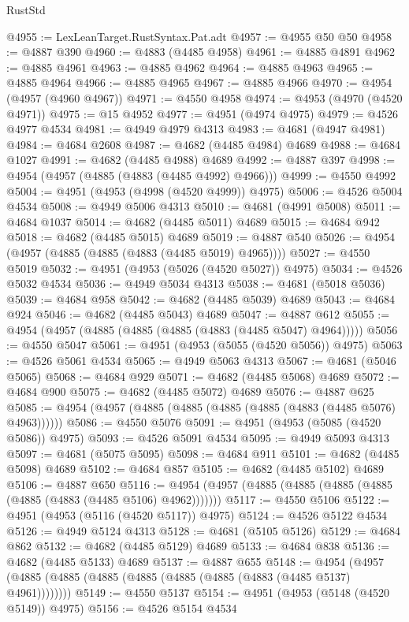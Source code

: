 \begin{lexlean}{RustStd}
\begin{coremodule}
@4955 := LexLeanTarget.RustSyntax.Pat.adt
@4957 := @4955 @50 @50
@4958 := @4887 @390
@4960 := @4883 (@4485 @4958)
@4961 := @4885 @4891
@4962 := @4885 @4961
@4963 := @4885 @4962
@4964 := @4885 @4963
@4965 := @4885 @4964
@4966 := @4885 @4965
@4967 := @4885 @4966
@4970 := @4954 (@4957 (@4960 @4967))
@4971 := @4550 @4958
@4974 := @4953 (@4970 (@4520 @4971))
@4975 := @15 @4952
@4977 := @4951 (@4974 @4975)
@4979 := @4526 @4977 @4534
@4981 := @4949 @4979 @4313
@4983 := @4681 (@4947 @4981)
@4984 := @4684 @2608
@4987 := @4682 (@4485 @4984) @4689
@4988 := @4684 @1027
@4991 := @4682 (@4485 @4988) @4689
@4992 := @4887 @397
@4998 := @4954 (@4957 (@4885 (@4883 (@4485 @4992) @4966)))
@4999 := @4550 @4992
@5004 := @4951 (@4953 (@4998 (@4520 @4999)) @4975)
@5006 := @4526 @5004 @4534
@5008 := @4949 @5006 @4313
@5010 := @4681 (@4991 @5008)
@5011 := @4684 @1037
@5014 := @4682 (@4485 @5011) @4689
@5015 := @4684 @942
@5018 := @4682 (@4485 @5015) @4689
@5019 := @4887 @540
@5026 := @4954 (@4957 (@4885 (@4885 (@4883 (@4485 @5019) @4965))))
@5027 := @4550 @5019
@5032 := @4951 (@4953 (@5026 (@4520 @5027)) @4975)
@5034 := @4526 @5032 @4534
@5036 := @4949 @5034 @4313
@5038 := @4681 (@5018 @5036)
@5039 := @4684 @958
@5042 := @4682 (@4485 @5039) @4689
@5043 := @4684 @924
@5046 := @4682 (@4485 @5043) @4689
@5047 := @4887 @612
@5055 := @4954 (@4957 (@4885 (@4885 (@4885 (@4883 (@4485 @5047) @4964)))))
@5056 := @4550 @5047
@5061 := @4951 (@4953 (@5055 (@4520 @5056)) @4975)
@5063 := @4526 @5061 @4534
@5065 := @4949 @5063 @4313
@5067 := @4681 (@5046 @5065)
@5068 := @4684 @929
@5071 := @4682 (@4485 @5068) @4689
@5072 := @4684 @900
@5075 := @4682 (@4485 @5072) @4689
@5076 := @4887 @625
@5085 := @4954 (@4957 (@4885 (@4885 (@4885 (@4885 (@4883 (@4485 @5076) @4963))))))
@5086 := @4550 @5076
@5091 := @4951 (@4953 (@5085 (@4520 @5086)) @4975)
@5093 := @4526 @5091 @4534
@5095 := @4949 @5093 @4313
@5097 := @4681 (@5075 @5095)
@5098 := @4684 @911
@5101 := @4682 (@4485 @5098) @4689
@5102 := @4684 @857
@5105 := @4682 (@4485 @5102) @4689
@5106 := @4887 @650
@5116 := @4954 (@4957 (@4885 (@4885 (@4885 (@4885 (@4885 (@4883 (@4485 @5106) @4962)))))))
@5117 := @4550 @5106
@5122 := @4951 (@4953 (@5116 (@4520 @5117)) @4975)
@5124 := @4526 @5122 @4534
@5126 := @4949 @5124 @4313
@5128 := @4681 (@5105 @5126)
@5129 := @4684 @862
@5132 := @4682 (@4485 @5129) @4689
@5133 := @4684 @838
@5136 := @4682 (@4485 @5133) @4689
@5137 := @4887 @655
@5148 := @4954 (@4957 (@4885 (@4885 (@4885 (@4885 (@4885 (@4885 (@4883 (@4485 @5137) @4961))))))))
@5149 := @4550 @5137
@5154 := @4951 (@4953 (@5148 (@4520 @5149)) @4975)
@5156 := @4526 @5154 @4534

\end{coremodule}
\end{lexlean}
